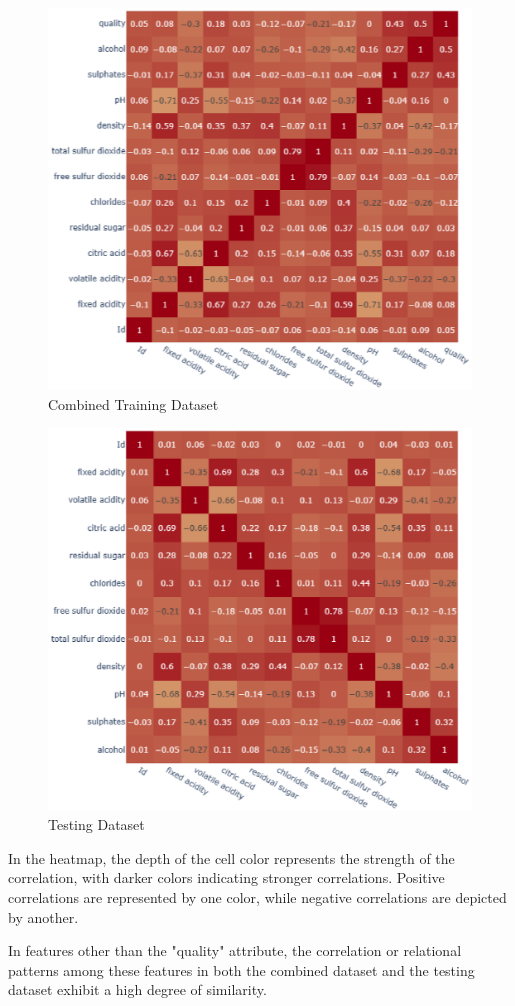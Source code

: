\begin{figure}[H]
	\centering
	\includegraphics[width=0.7\linewidth]{tex/CombinedTrainingDataset}
	\caption{Combined Training Dataset}
	\label{fig:combinedtrainingdataset}
\end{figure}

\begin{figure}[H]
	\centering
	\includegraphics[width=0.7\linewidth]{tex/TestingDataset}
	\caption{Testing Dataset}
	\label{fig:testingdataset}
\end{figure}

In the heatmap, the depth of the cell color represents the strength of the correlation, with darker colors indicating stronger correlations. Positive correlations are represented by one color, while negative correlations are depicted by another.

In features other than the "quality" attribute, the correlation or relational patterns among these features in both the combined dataset and the testing dataset exhibit a high degree of similarity.

